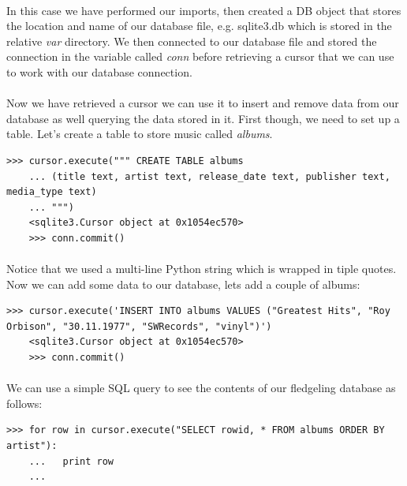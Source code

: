 \documentclass[12pt, a4paper, twoside]{book}
\begin{document}
\paragraph{} In this case we have performed our imports, then created a DB object that stores the location and name of our database file, e.g. sqlite3.db which is stored in the relative \emph{var} directory. We then connected to our database file and stored the connection in the variable called \emph{conn} before retrieving a cursor that we can use to work with our database connection.

\paragraph{} Now we have retrieved a cursor we can use it to insert and remove data from our database as well querying the data stored in it. First though, we need to set up a table. Let's create a table to store music called \emph{albums}.

\begin{lstlisting}[style=DOS]
    >>> cursor.execute(""" CREATE TABLE albums
    ... (title text, artist text, release_date text, publisher text, media_type text)
    ... """)
    <sqlite3.Cursor object at 0x1054ec570>
    >>> conn.commit()
\end{lstlisting}

\paragraph{} Notice that we used a multi-line Python string which is wrapped in tiple quotes. Now we can add some data to our database, lets add a couple of albums:

\begin{lstlisting}[style=DOS]
    >>> cursor.execute('INSERT INTO albums VALUES ("Greatest Hits", "Roy Orbison", "30.11.1977", "SWRecords", "vinyl")')
    <sqlite3.Cursor object at 0x1054ec570>
    >>> conn.commit()
\end{lstlisting}

\paragraph{} We can use a simple SQL query to see the contents of our fledgeling database as follows:

\begin{lstlisting}[style=DOS]
    >>> for row in cursor.execute("SELECT rowid, * FROM albums ORDER BY artist"):
    ...   print row
    ...
\end{lstlisting}
\end{document}
